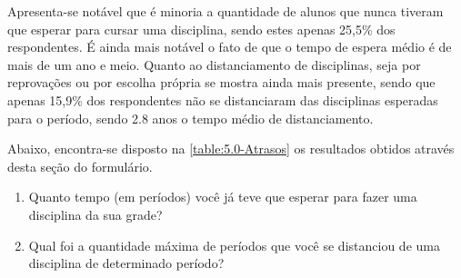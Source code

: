 \begin{apendicesenv}

  Apresenta-se notável que é minoria a quantidade de alunos que nunca tiveram que esperar para cursar uma disciplina, sendo estes apenas 25,5\% dos respondentes. É ainda mais notável o fato de que o tempo de espera médio é de mais de um ano e meio. Quanto ao distanciamento de disciplinas, seja por reprovações ou por escolha própria se mostra ainda mais presente, sendo que apenas 15,9\% dos respondentes não se distanciaram das disciplinas esperadas para o período, sendo 2.8 anos o tempo médio de distanciamento.

  Abaixo, encontra-se disposto na \autoref{table:5.0-Atrasos} os resultados obtidos através desta seção do formulário.

  \begin{enumerate}
    \item Quanto tempo (em períodos) você já teve que esperar para fazer uma disciplina da sua grade?
    \item Qual foi a quantidade máxima de períodos que você se distanciou de uma disciplina de determinado período?
  \end{enumerate}


\end{apendicesenv}

